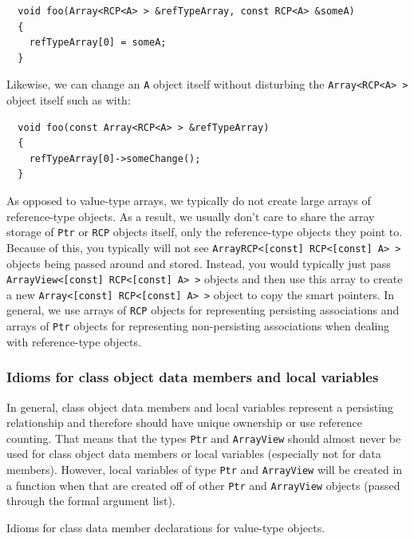 \documentclass[pdf,ps2pdf,11pt]{SANDreport}
\begin{document}
{\small\begin{verbatim}
  void foo(Array<RCP<A> > &refTypeArray, const RCP<A> &someA)
  {
    refTypeArray[0] = someA;
  }
\end{verbatim}}

Likewise, we can change an {}\texttt{A} object itself without
disturbing the {}\texttt{Array<RCP<A> >} object itself such as with:

{\small\begin{verbatim}
  void foo(const Array<RCP<A> > &refTypeArray)
  {
    refTypeArray[0]->someChange();
  }
\end{verbatim}}

As opposed to value-type arrays, we typically do not create large
arrays of reference-type objects.  As a result, we usually don't care
to share the array storage of {}\texttt{Ptr} or {}\texttt{RCP} objects
itself, only the reference-type objects they point to.  Because of
this, you typically will not see {}\texttt{ArrayRCP<[const]
RCP<[const] A> >} objects being passed around and stored.  Instead,
you would typically just pass {}\texttt{ArrayView<[const] RCP<[const]
A> >} objects and then use this array to create a new
{}\texttt{Array<[const] RCP<[const] A> >} object to copy the smart
pointers.  In general, we use arrays of {}\texttt{RCP} objects for
representing persisting associations and arrays of {}\texttt{Ptr}
objects for representing non-persisting associations when dealing with
reference-type objects.


%
{}\subsubsection{Idioms for class object data members and local
variables}
%

In general, class object data members and local variables represent a
persisting relationship and therefore should have unique ownership or
use reference counting.  That means that the types {}\texttt{Ptr} and
{}\texttt{ArrayView} should almost never be used for class object data
members or local variables (especially not for data members).
However, local variables of type {}\texttt{Ptr} and
{}\texttt{ArrayView} will be created in a function when that are
created off of other {}\texttt{Ptr} and {}\texttt{ArrayView} objects
(passed through the formal argument list).

\begin{table}
%
\begin{center}
%
%

%
%
\end{center}
\caption{\label{fig:data_member_value_type}
Idioms for class data member declarations for value-type objects.}
%
\end{table}
\end{document}
